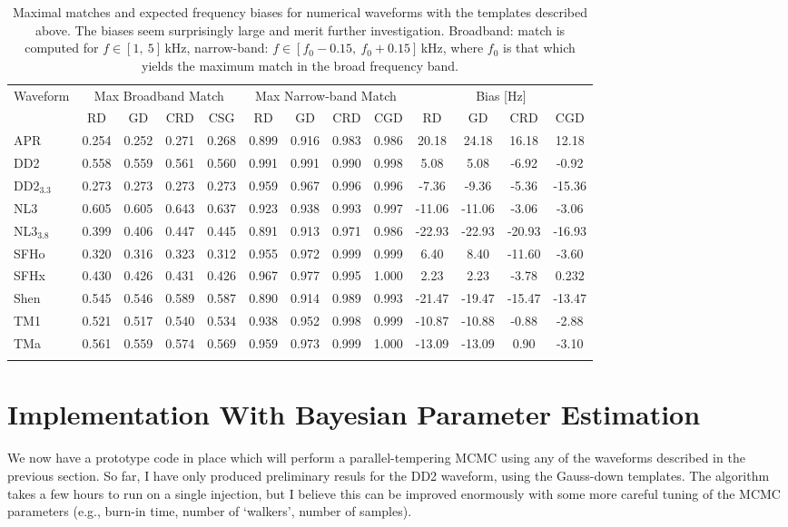 \documentclass[showpacs, superscriptaddress, showpacs, letterpaper, showkeys,
preprintnumbers, altaffilletter, amssymb, amsmath, amsfonts, prd,
onecolumn, floatfix, nofootinbib]{revtex4-1}
\begin{document}
\begin{table}
\centering
\begin{tabular}{l | cccc | cccc | cccc}
\toprule
\multirow{2}{*}{Waveform} & \multicolumn{4}{c|}{Max Broadband Match} &
\multicolumn{4}{c|}{Max Narrow-band Match} & \multicolumn{4}{c}{Bias [Hz]} \\
& RD & GD & CRD & CSG & RD & GD & CRD & CGD & RD & GD & CRD & CGD \\
\colrule
APR & 0.254 & 0.252 & 0.271 & 0.268 & 0.899 & 0.916 & 0.983 & 0.986 & 20.18 & 24.18 & 16.18 & 12.18 \\
DD2 & 0.558 & 0.559 & 0.561 & 0.560 & 0.991 & 0.991 & 0.990 & 0.998 & 5.08 & 5.08 & -6.92 &  -0.92 \\
DD2$_{3.3}$ & 0.273 & 0.273 & 0.273 & 0.273 & 0.959 & 0.967 & 0.996 & 0.996 & -7.36 & -9.36 & -5.36 &  -15.36 \\
NL3 & 0.605 & 0.605 & 0.643 & 0.637 & 0.923 & 0.938 & 0.993 & 0.997 & -11.06 & -11.06 & -3.06 & -3.06\\
NL3$_{3.8}$ & 0.399 & 0.406 & 0.447 & 0.445 & 0.891 & 0.913 & 0.971 & 0.986 & -22.93 & -22.93 & -20.93 &  -16.93 \\
SFHo & 0.320 & 0.316 & 0.323 & 0.312 & 0.955 & 0.972 & 0.999 & 0.999 & 6.40 & 8.40 & -11.60 & -3.60 \\
SFHx & 0.430 & 0.426 & 0.431 & 0.426 & 0.967 & 0.977 & 0.995 & 1.000 & 2.23 & 2.23 & -3.78 & 0.232\\
Shen & 0.545 & 0.546 & 0.589 & 0.587 & 0.890 & 0.914 & 0.989 & 0.993 & -21.47 & -19.47 & -15.47 &  -13.47 \\
TM1  & 0.521 & 0.517 & 0.540 & 0.534 & 0.938 & 0.952 & 0.998 & 0.999 & -10.87 & -10.88 & -0.88 & -2.88 \\
TMa  & 0.561 & 0.559 & 0.574 & 0.569 & 0.959 & 0.973 & 0.999 & 1.000 & -13.09 & -13.09 & 0.90 & -3.10 \\
\colrule
\end{tabular}
\caption{Maximal matches and expected frequency biases for numerical waveforms
with the templates described above.  The biases seem surprisingly large and
merit further investigation.  Broadband: match is computed for
$f\in[1,~5]$\,kHz, narrow-band: $f\in[f_0-0.15,~f_0+0.15]$\,kHz, where $f_0$ is
that which yields the maximum match in the broad frequency band.}
\end{table}


\section{Implementation With Bayesian Parameter Estimation}
We now have a prototype code in place which will perform a parallel-tempering
MCMC using any of the waveforms described in the previous section.  So far, I
have only produced preliminary resuls for the DD2 waveform, using the Gauss-down
templates.  The algorithm takes a few hours to run on a single injection, but I
believe this can be improved enormously with some more careful tuning of the
MCMC parameters (e.g., burn-in time, number of `walkers', number of samples).
\end{document}

